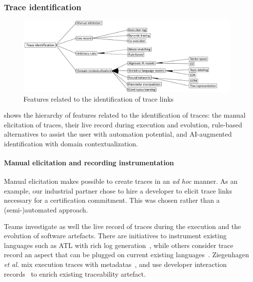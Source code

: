 \subsubsection{Trace identification}
\label{sec:fm:identification}
\begin{figure}[h]
	\centering
	\includegraphics[width=.99\linewidth]{images/fm-identification}
	\caption{Features related to the identification of trace links}
	\label{fig:fm:identification}
\end{figure}

 shows the hierarchy of features related to the identification of traces: 
the manual elicitation of traces, 
their live record during execution and evolution,
rule-based alternatives to assist the user with automation potential, 
and AI-augmented identification with domain contextualization.



\paragraph{Manual elicitation and recording instrumentation} 
Manual elicitation makes possible to create traces in an \textit{ad hoc} manner. As an example, our industrial partner chose to hire a developer to elicit trace links necessary for a certification commitment. This was chosen rather than a (semi-)automated approach.

Teams investigate as well the {live record} of traces during the execution and the evolution of software artefacts. There are initiatives to instrument existing languages such as ATL with rich log generation~\cite{Santiago_2013,la_Fosse_2018}, while others consider trace record an aspect that can be plugged on current existing languages~\cite{Pfeiffer_2014,Santiago_2013}. Ziegenhagen \textit{et al.} mix execution traces with metadatas~\cite{ziegenhagen2020-expanding-tracea-with-dynamic-tracing-data}, and use developer interaction records~\cite{ziegenhagen2019-developer-tool-interaction} to enrich existing traceability artefact.

